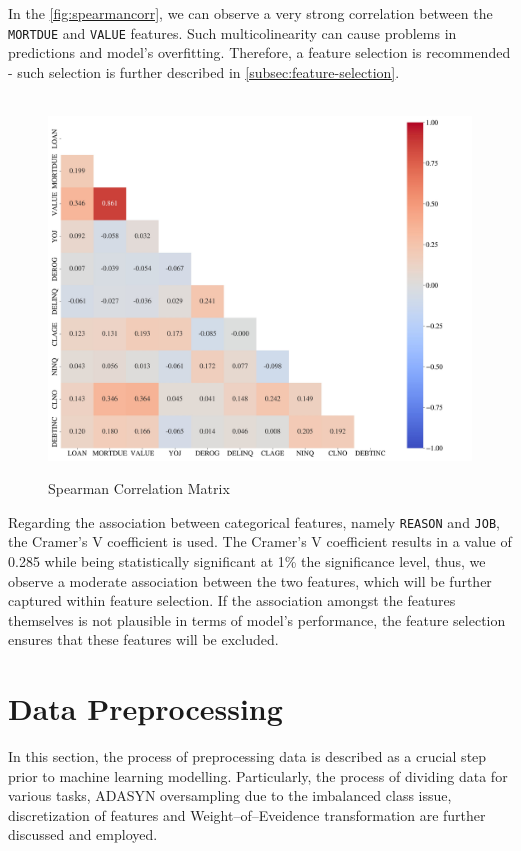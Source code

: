 \newpage
In the \autoref{fig:spearmancorr}, we can observe a very strong correlation between the \texttt{MORTDUE} and \texttt{VALUE} features. Such multicolinearity can cause problems in predictions and model's overfitting. Therefore, a feature selection is recommended - such selection is further described in \autoref{subsec:feature-selection}.
\begin{figure}[H]
    \centering
    \caption{Spearman Correlation Matrix}\vspace{0.5em}
    \label{fig:spearmancorr}\
    \includegraphics[width=150mm]{Figures/Spearman_Correlation_Matrix_Numeric_Features.jpg}

    \vspace{-1em}
\end{figure}

Regarding the association between categorical features, namely \texttt{REASON} and \texttt{JOB}, the Cramer's V coefficient is used. The Cramer's V coefficient results in a value of 0.285 while being statistically significant at 1\% the significance level, thus, we observe a moderate  association between the two features, which will be further captured within feature selection.
If the association amongst the features themselves is not plausible in terms of model's performance, the feature selection ensures that these features will be excluded.


\newpage
\section{Data Preprocessing}
\label{sec:dataprep}
In this section, the process of preprocessing data is described as a crucial step prior to machine learning modelling. Particularly, the process of dividing data for various tasks, ADASYN oversampling due to the imbalanced class issue, discretization of features and Weight--of--Eveidence transformation are further discussed and employed.

